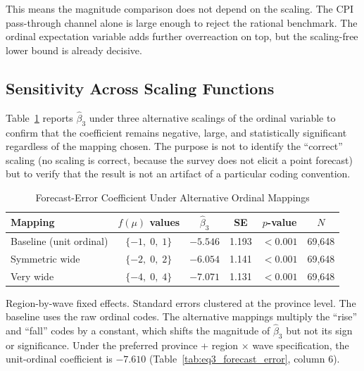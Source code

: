 This means the magnitude comparison does not depend on
the scaling.
The CPI pass-through channel alone is large enough to reject
the rational benchmark.
The ordinal expectation variable adds further overreaction
on top, but the scaling-free lower bound is already decisive.

\subsection{Sensitivity Across Scaling Functions}

Table~\ref{tab:scaling_sensitivity} reports $\hat{\beta}_3$
under three alternative scalings of the ordinal variable to
confirm that the coefficient remains negative, large, and
statistically significant regardless of the mapping chosen.
The purpose is not to identify the ``correct'' scaling (no
scaling is correct, because the survey does not elicit a point
forecast) but to verify that the result is not an artifact of
a particular coding convention.

\begin{table}[htbp]
\centering
\caption{Forecast-Error Coefficient Under Alternative
  Ordinal Mappings}
\label{tab:scaling_sensitivity}
\begin{threeparttable}
\begin{tabular}{lccccc}
\toprule
Mapping & $f(\mu)$ values &
  $\hat{\beta}_3$ & SE & $p$-value & $N$ \\
\midrule
Baseline (unit ordinal) & $\{-1,\;0,\;1\}$
  & $-5.546$ & 1.193 & $<0.001$ & 69,648 \\
Symmetric wide          & $\{-2,\;0,\;2\}$
  & $-6.054$ & 1.141 & $<0.001$ & 69,648 \\
Very wide               & $\{-4,\;0,\;4\}$
  & $-7.071$ & 1.131 & $<0.001$ & 69,648 \\
\bottomrule
\end{tabular}
\begin{tablenotes}[flushleft]
\footnotesize
\item Region-by-wave fixed effects. Standard errors clustered
  at the province level. The baseline uses the raw ordinal
  codes. The alternative mappings multiply the ``rise'' and
  ``fall'' codes by a constant, which shifts the magnitude
  of $\hat{\beta}_3$ but not its sign or significance.
  Under the preferred province + region $\times$ wave
  specification, the unit-ordinal coefficient is $-7.610$
  (Table~\ref{tab:eq3_forecast_error}, column 6).
\end{tablenotes}
\end{threeparttable}
\end{table}

